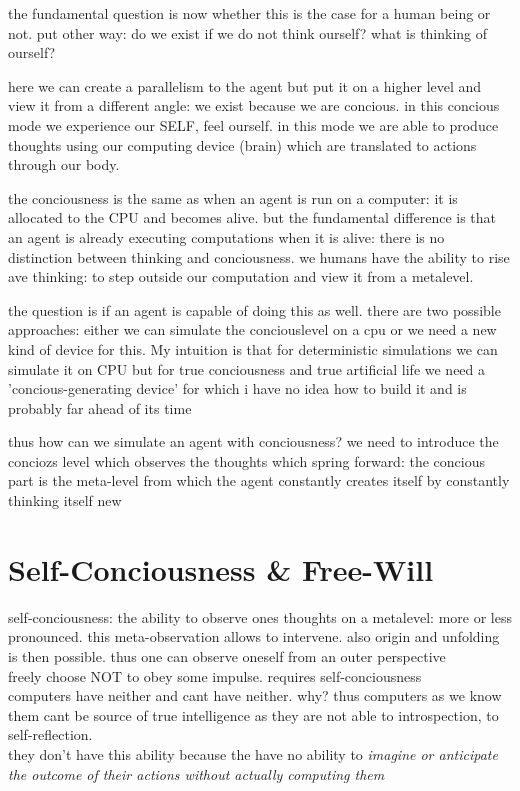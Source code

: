 \documentclass[twocolumn]{article}
\begin{document}
the fundamental question is now whether this is the case for a human being or not. put other way: do we exist if we do not think ourself? what is thinking of ourself?

here we can create a parallelism to the agent but put it on a higher level and view it from a different angle: we exist because we are concious. in this concious mode we experience our SELF, feel ourself. in this mode we are able to produce thoughts using our computing device (brain) which are translated to actions through our body.

the conciousness is the same as when an agent is run on a computer: it is allocated to the CPU and becomes alive. but the fundamental difference is that an agent is already executing computations when it is alive: there is no distinction between thinking and conciousness. we humans have the ability to rise ave thinking: to step outside our computation and view it from a metalevel. 

the question is if an agent is capable of doing this as well. there are two possible approaches: either we can simulate the conciouslevel on a cpu or we need a new kind of device for this. My intuition is that for deterministic simulations we can simulate it on CPU but for true conciousness and true artificial life we need a 'concious-generating device' for which i have no idea how to build it and is probably far ahead of its time

thus how can we simulate an agent with conciousness? we need to introduce the conciozs level which observes the thoughts which spring forward: the concious part is the meta-level from which the agent constantly creates itself by constantly thinking itself new 

\section{Self-Conciousness \& Free-Will}
self-conciousness: the ability to observe ones thoughts on a metalevel: more or less pronounced. this meta-observation allows to intervene. also origin and unfolding is then possible. thus one can observe oneself from an outer perspective \\

freely choose NOT to obey some impulse. requires self-conciousness \\

computers have neither and cant have neither. why? thus computers as we know them cant be source of true intelligence as they are not able to introspection, to self-reflection. \\
they don't have this ability because the have no ability to \textit{imagine or anticipate the outcome of their actions without actually computing them}
\end{document}
